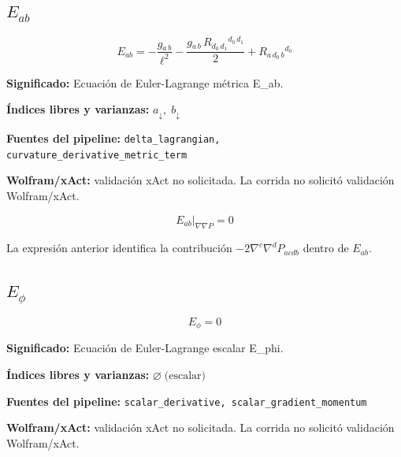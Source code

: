 \documentclass[11pt]{article}
\begin{document}
\subsection*{$ E_{ab} $}
\begin{dmath*}[breakdepth={5}]
E_{ab} = -\frac{g{}_{a\,b}}{{\ell}^{2}} - \frac{g{}_{a\,b}\,R{}_{d_{0}\,d_{1}}{}^{d_{0}\,d_{1}}}{2} + R{}_{a\,d_{0}\,b}{}^{d_{0}}
\end{dmath*}
\par\vspace{1.2\baselineskip}\noindent
\begin{minipage}{\linewidth}
\textbf{Significado:} Ecuación de Euler-Lagrange métrica E\_ab.\par
\textbf{Índices libres y varianzas:} $ a_{\downarrow},\;b_{\downarrow} $\par
\textbf{Fuentes del pipeline:} \texttt{delta\_lagrangian, curvature\_derivative\_metric\_term}\par
\textbf{Wolfram/xAct:} validación xAct no solicitada. La corrida no solicitó validación Wolfram/xAct.\par
\end{minipage}
\begin{dmath*}[breakdepth={5}]
\left.E_{ab}\right|_{\nabla\nabla P} = 0
\end{dmath*}
\par\vspace{0.8\baselineskip}\noindent
\begin{minipage}{\linewidth}
La expresión anterior identifica la contribución $-2\nabla^c\nabla^dP_{acdb}$ dentro de $E_{ab}$.\par
\end{minipage}
\subsection*{$ E_{\phi} $}
\begin{dmath*}[breakdepth={5}]
E_{\phi} = 0
\end{dmath*}
\par\vspace{1.2\baselineskip}\noindent
\begin{minipage}{\linewidth}
\textbf{Significado:} Ecuación de Euler-Lagrange escalar E\_phi.\par
\textbf{Índices libres y varianzas:} $ \varnothing\;\text{(escalar)} $\par
\textbf{Fuentes del pipeline:} \texttt{scalar\_derivative, scalar\_gradient\_momentum}\par
\textbf{Wolfram/xAct:} validación xAct no solicitada. La corrida no solicitó validación Wolfram/xAct.\par
\end{minipage}
\end{document}
